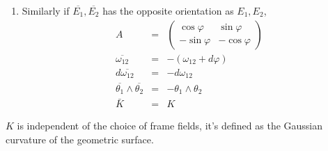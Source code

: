 \documentclass{article}
\newenvironment{enumeratenumeric}{\begin{enumerate}[1.] }{\end{enumerate}}
\begin{document}
\begin{enumeratenumeric}
\begin{eqnarray}
    d \overline{\omega_{12}} & = & d \omega_{12} \nonumber\\
    \overline{\theta_1} \wedge \overline{\theta_2} & = & \theta_1 \wedge
    \theta_2 \nonumber\\
    \bar{K} & = & K \nonumber
  \end{eqnarray}
  \item Similarly if $\overline{E_1}, \overline{E_2}$ has the opposite
  orientation as $E_1, E_2$,
  \begin{eqnarray}
    A & = & \left(\begin{array}{cc}
      \cos \varphi & \sin \varphi\\
      - \sin \varphi & - \cos \varphi
    \end{array}\right) \nonumber\\
    \overline{\omega_{12}} & = & - (\omega_{12} + d \varphi) \\
    d \overline{\omega_{12}} & = & - d \omega_{12} \nonumber\\
    \overline{\theta_1} \wedge \overline{\theta_2} & = & - \theta_1 \wedge
    \theta_2 \nonumber\\
    \bar{K} & = & K \nonumber
  \end{eqnarray}
\end{enumeratenumeric}
$K$ is independent of the choice of frame fields, it's defined as the Gaussian
curvature of the geometric surface.
\end{document}
